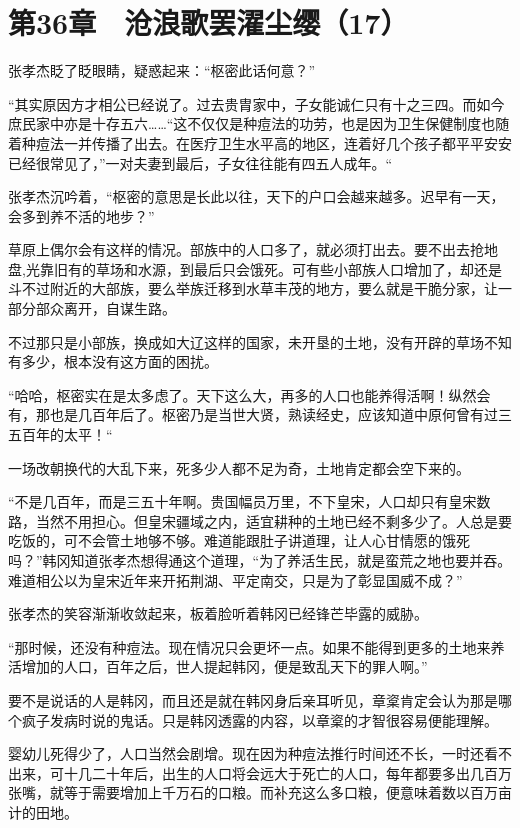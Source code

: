 \section{第36章　沧浪歌罢濯尘缨（17）}

张孝杰眨了眨眼睛，疑惑起来：“枢密此话何意？”

“其实原因方才相公已经说了。过去贵胄家中，子女能诚仁只有十之三四。而如今庶民家中亦是十存五六……“这不仅仅是种痘法的功劳，也是因为卫生保健制度也随着种痘法一并传播了出去。在医疗卫生水平高的地区，连着好几个孩子都平平安安已经很常见了，”一对夫妻到最后，子女往往能有四五人成年。“

张孝杰沉吟着，“枢密的意思是长此以往，天下的户口会越来越多。迟早有一天，会多到养不活的地步？”

草原上偶尔会有这样的情况。部族中的人口多了，就必须打出去。要不出去抢地盘,光靠旧有的草场和水源，到最后只会饿死。可有些小部族人口增加了，却还是斗不过附近的大部族，要么举族迁移到水草丰茂的地方，要么就是干脆分家，让一部分部众离开，自谋生路。

不过那只是小部族，换成如大辽这样的国家，未开垦的土地，没有开辟的草场不知有多少，根本没有这方面的困扰。

“哈哈，枢密实在是太多虑了。天下这么大，再多的人口也能养得活啊！纵然会有，那也是几百年后了。枢密乃是当世大贤，熟读经史，应该知道中原何曾有过三五百年的太平！“

一场改朝换代的大乱下来，死多少人都不足为奇，土地肯定都会空下来的。

“不是几百年，而是三五十年啊。贵国幅员万里，不下皇宋，人口却只有皇宋数路，当然不用担心。但皇宋疆域之内，适宜耕种的土地已经不剩多少了。人总是要吃饭的，可不会管土地够不够。难道能跟肚子讲道理，让人心甘情愿的饿死吗？”韩冈知道张孝杰想得通这个道理，“为了养活生民，就是蛮荒之地也要并吞。难道相公以为皇宋近年来开拓荆湖、平定南交，只是为了彰显国威不成？”

张孝杰的笑容渐渐收敛起来，板着脸听着韩冈已经锋芒毕露的威胁。

“那时候，还没有种痘法。现在情况只会更坏一点。如果不能得到更多的土地来养活增加的人口，百年之后，世人提起韩冈，便是致乱天下的罪人啊。”

要不是说话的人是韩冈，而且还是就在韩冈身后亲耳听见，章楶肯定会认为那是哪个疯子发病时说的鬼话。只是韩冈透露的内容，以章楶的才智很容易便能理解。

婴幼儿死得少了，人口当然会剧增。现在因为种痘法推行时间还不长，一时还看不出来，可十几二十年后，出生的人口将会远大于死亡的人口，每年都要多出几百万张嘴，就等于需要增加上千万石的口粮。而补充这么多口粮，便意味着数以百万亩计的田地。

